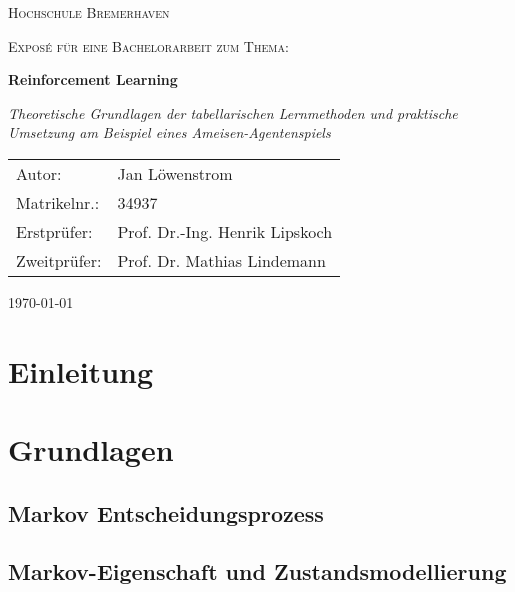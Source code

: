 \documentclass[12pt]{scrartcl}
\numberwithin{equation}{section}
\begin{document}
\begin{titlepage}
	\centering	
	{\scshape\LARGE Hochschule Bremerhaven \par}
	\vspace{1cm}
	{\scshape\Large Exposé für eine Bachelorarbeit zum Thema:\par}
	\vspace{1.5cm}
	{\huge\bfseries Reinforcement Learning\par}
	\vspace{2cm}
	{\Large\itshape Theoretische Grundlagen der tabellarischen Lernmethoden und praktische Umsetzung am Beispiel eines Ameisen-Agentenspiels
	\par}
	\vfill
	\begin{tabularx}{\textwidth}{lX}
		Autor: & Jan Löwenstrom \\
		Matrikelnr.: & 34937 \\
		Erstprüfer: & Prof. Dr.-Ing. Henrik Lipskoch \\
		Zweitprüfer: & Prof. Dr. Mathias Lindemann \\
	\end{tabularx}  
    \vfill

	{\large \today \par}       
\end{titlepage}

\setcounter{page}{2}
\tableofcontents
\pagebreak
\listoffigures
\newpage


\noindent
\section{Einleitung}


\pagebreak

\section{Grundlagen}
	
	\subsection{Markov Entscheidungsprozess}\label{sec:MDP}
	

	\subsection{Markov-Eigenschaft und Zustandsmodellierung}\label{sec:MP}
	
	\pagebreak
\end{document}
